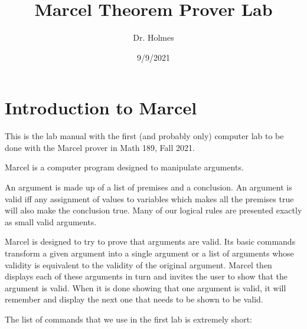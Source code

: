 \documentclass[12pt]{article}
\title{Marcel Theorem Prover Lab}
\author{Dr. Holmes}
\date{9/9/2021}
\begin{document}
\maketitle

\section{Introduction to Marcel}

This is the lab manual with the first (and probably only) computer lab to be done with the Marcel prover in Math 189, Fall 2021.

Marcel is a computer program designed to manipulate arguments.

An argument is made up of a list of premises and a conclusion.  An argument is valid iff any assignment of values to variables which makes all the premises
true will also make the conclusion true.  Many of our logical rules are presented exactly as small valid arguments.

Marcel is designed to try to prove that arguments are valid.  Its basic commands transform a given argument into a single argument or a list of arguments
whose validity is equivalent to the validity of the original argument.  Marcel then displays each of these arguments in turn and invites the user to show that the argument is valid.  When it is done showing that one argument is valid, it will remember and display the next one that needs to be shown to be valid.

The list of commands that we use in the first lab is extremely short:
\end{document}
